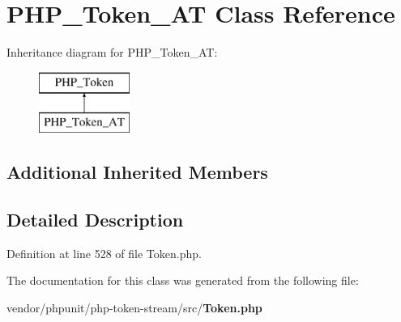\section{P\+H\+P\+\_\+\+Token\+\_\+\+A\+T Class Reference}
\label{class_p_h_p___token___a_t}
Inheritance diagram for P\+H\+P\+\_\+\+Token\+\_\+\+A\+T\+:\begin{figure}[H]
\begin{center}
\leavevmode
\includegraphics[height=2.000000cm]{class_p_h_p___token___a_t}
\end{center}
\end{figure}
\subsection*{Additional Inherited Members}


\subsection{Detailed Description}


Definition at line 528 of file Token.\+php.



The documentation for this class was generated from the following file\+:\begin{DoxyCompactItemize}
\item 
vendor/phpunit/php-\/token-\/stream/src/{\bf Token.\+php}\end{DoxyCompactItemize}
